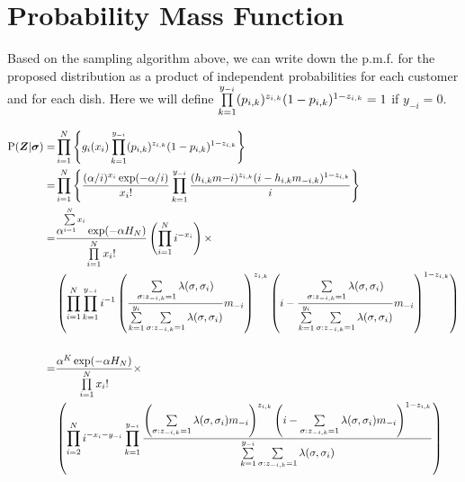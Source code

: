 

\section{Probability Mass Function}
Based on the sampling algorithm above, we can write down the p.m.f. for the
proposed distribution as a product of independent probabilities for 
each customer and for each dish. Here we will define 
$\prod\limits_{k=1}^{y_{-i}} (p_{i,k})^{z_{i,k}}(1-p_{i,k})^{1-z_{i,k}}=1$ if $y_{-i}=0$.

\begin{align*}
  \text{P}(\bm Z|\bm\sigma)
  =&\prod\limits_{i=1}^{N} \left\{g_i(x_i) \prod\limits_{k=1}^{y_{-i}} 
    (p_{i,k})^{z_{i,k}}(1-p_{i,k})^{1-z_{i,k}}\right\}\\
  =&\prod\limits_{i=1}^{N} \left\{ \displaystyle\frac{(\alpha/i)^{x_i}\exp(-\alpha/i)}{x_i!} 
    \prod\limits_{k=1}^{y_{-i}} 
    \displaystyle\frac{(h_{i,k}m{-i})^{z_{i,k}}(i-h_{i,k}m_{-i,k})^{1-z_{i,k}}}{i} 
    \right\} \\
  =&\displaystyle\frac{\alpha^{\sum\limits_{i=1}^{N}x_i} \exp(-\alpha H_N)} {\prod\limits_{i=1}^{N}x_i!} 
    \left( \prod\limits_{i=1}^{N}i^{-x_i} \right) \times
    \\
    &\left( \prod\limits_{i=1}^{N}\prod\limits_{k=1}^{y_{-i}} i^{-1}
    \displaystyle\left(\displaystyle\frac{\sum\limits_{\sigma:z_{-i,k}=1}^{}\lambda(\sigma,\sigma_i)} {\sum\limits_{k=1}^{y_i}\sum\limits_{\sigma:z_{-i,k}=1}^{}\lambda(\sigma,\sigma_i)} m_{-i}\right)^{z_{i,k}}
       \left(i-\displaystyle\frac{\sum\limits_{\sigma:z_{-i,k}=1}^{}\lambda(\sigma,\sigma_i)} {\sum\limits_{k=1}^{y_i}\sum\limits_{\sigma:z_{-i,k}=1}^{}\lambda(\sigma,\sigma_i)} m_{-i}\right)^{1-z_{i,k}} \right)\\
   &\\
  =&\displaystyle\frac{\alpha^K \exp(-\alpha H_N)} {\prod\limits_{i=1}^{N}x_i!} \times
    \\
    &\left( \prod\limits_{i=2}^{N} i^{-x_i-y_{-i}}\prod\limits_{k=1}^{y_{-i}} 
    \displaystyle\frac{
    \left(\sum\limits_{\sigma:z_{-i,k}=1}^{}\lambda(\sigma,\sigma_i)m_{-i}\right)^{z_{i,k}}
    \left(i-\sum\limits_{\sigma:z_{-i,k}=1}^{}
    \lambda(\sigma,\sigma_i)m_{-i}\right)^{1-z_{i,k}}
    }
    {\sum\limits_{k=1}^{y_{-i}}\sum\limits_{\sigma:z_{-i,k}=1}^{}\lambda(\sigma,\sigma_i)}\right)
\end{align*}

